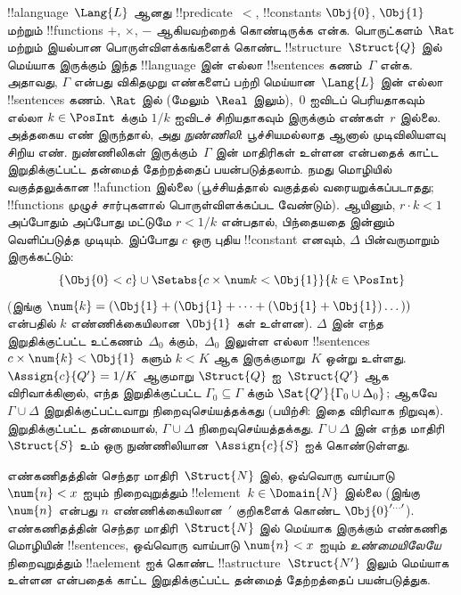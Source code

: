\documentclass[../../../include/open-logic-section]{subfiles}
\begin{document}
{%
\begin{ex}
!!a{language}~$\Lang{L}$ ஆனது !!{predicate}~$<$, !!{constant}s $\Obj{0}$,
$\Obj{1}$ மற்றும் !!{function}s $+$, $\times$, $-$ ஆகியவற்றைக் கொண்டிருக்க
என்க. பொருட்களம்~$\Rat$ மற்றும் இயல்பான பொருள்விளக்கங்களைக் கொண்ட
!!{structure}~$\Struct{Q}$ இல் மெய்யாக இருக்கும் இந்த !!{language} இன் எல்லா
!!{sentence}s கணம்~$\Gamma$ என்க. அதாவது, $\Gamma$ என்பது விகிதமுறு எண்களைப்
பற்றி மெய்யான~$\Lang{L}$ இன் எல்லா !!{sentence}s கணம். $\Rat$ இல்
(மேலும்~$\Real$ இலும்),~$0$ ஐவிடப் பெரியதாகவும் எல்லா
$k \in \PosInt$ க்கும் $1/k$ ஐவிடச் சிறியதாகவும் இருக்கும் எண்கள்~$r$ இல்லை.
அத்தகைய எண் இருந்தால், அது \emph{நுண்ணிலி}: பூச்சியமல்லாத ஆனால் முடிவிலியளவு
சிறிய எண். நுண்ணிலிகள் இருக்கும்~$\Gamma$ இன் மாதிரிகள் உள்ளன என்பதைக் காட்ட
இறுதிக்குட்பட்ட தன்மைத் தேற்றத்தைப் பயன்படுத்தலாம். நமது மொழியில்
வகுத்தலுக்கான !!a{function} இல்லை (பூச்சியத்தால் வகுத்தல் வரையறுக்கப்படாதது;
!!{function}s முழுச் சார்புகளால் பொருள்விளக்கப்பட வேண்டும்). ஆயினும்,
$r \cdot k < 1$ அப்போதும் அப்போது மட்டுமே $r < 1/k$ என்பதால், பிந்தையதை
இன்னும் வெளிப்படுத்த முடியும். இப்போது $c$ ஒரு புதிய !!{constant} எனவும்,
$\Delta$ பின்வருமாறும் இருக்கட்டும்:
\[
\{\Obj{0} < c\}
\cup \Setabs{ c \times \num k < \Obj{1} }{k \in \PosInt}
\]
(இங்கு $\num{k} = (\Obj{1} + (\Obj{1} + \dots + (\Obj{1} +
\Obj{1})\dots))$ என்பதில் $k$ எண்ணிக்கையிலான~$\Obj{1}$ கள் உள்ளன).
$\Delta$ இன் எந்த இறுதிக்குட்பட்ட உட்கணம்~$\Delta_0$ க்கும்,~$\Delta_0$
இலுள்ள எல்லா !!{sentence}s $c \times \num{k} < \Obj{1}$ களும் $k < K$
ஆக இருக்குமாறு~$K$ ஒன்று உள்ளது. $\Assign{c}{Q'} = 1/K$ ஆகுமாறு
$\Struct{Q}$ ஐ~$\Struct{Q'}$ ஆக விரிவாக்கினால், எந்த இறுதிக்குட்பட்ட
$\Gamma_0 \subseteq \Gamma$ க்கும் $\Sat{Q'}{\Gamma_0 \cup \Delta_0}$;
ஆகவே~$\Gamma \cup \Delta$ இறுதிக்குட்பட்டவாறு நிறைவுசெய்யத்தக்கது
(பயிற்சி: இதை விரிவாக நிறுவுக). இறுதிக்குட்பட்ட தன்மையால்,
$\Gamma \cup \Delta$ நிறைவுசெய்யத்தக்கது. $\Gamma \cup \Delta$ இன் எந்த
மாதிரி~$\Struct{S}$ உம் ஒரு நுண்ணிலியான~$\Assign{c}{S}$ ஐக் கொண்டுள்ளது.
\end{ex}
}{}

\begin{prob}
எண்கணிதத்தின் செந்தர மாதிரி~$\Struct{N}$ இல், ஒவ்வொரு வாய்பாடு
$\num{n} < x$ ஐயும் நிறைவுறுத்தும் !!{element}~$k \in \Domain{N}$ இல்லை
(இங்கு~$\num{n}$ என்பது $n$ எண்ணிக்கையிலான~$\prime$ குறிகளைக் கொண்ட
$\Obj{0}^{\prime\dots\prime}$). எண்கணிதத்தின் செந்தர மாதிரி~$\Struct{N}$
இல் மெய்யாக இருக்கும் எண்கணித மொழியின் !!{sentence}s, ஒவ்வொரு வாய்பாடு
$\num{n} < x$ ஐயும் \emph{உண்மையிலேயே} நிறைவுறுத்தும் !!a{element} ஐக்
கொண்ட !!a{structure}~$\Struct{N'}$ இலும் மெய்யாக உள்ளன என்பதைக் காட்ட
இறுதிக்குட்பட்ட தன்மைத் தேற்றத்தைப் பயன்படுத்துக.
\end{prob}
\tagendprob
\end{document}
